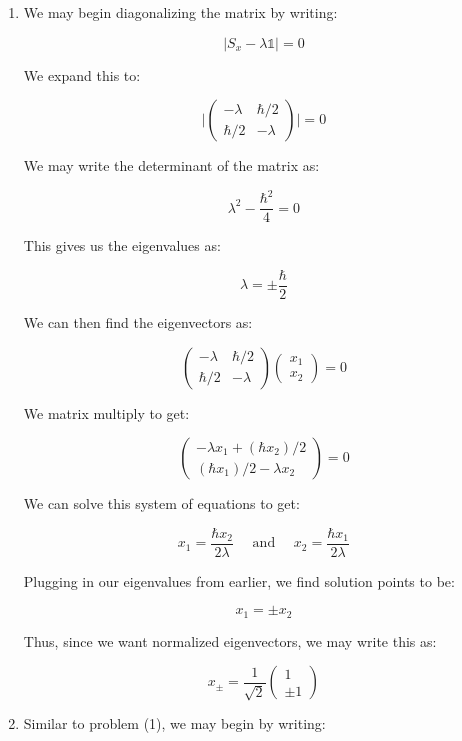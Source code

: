 \begin{enumerate}

  \item We may begin diagonalizing the matrix by writing:

    $$|S_x-\lambda \mathbb{1}|=0$$

    We expand this to:

    $$\Big|\left( \begin{matrix} -\lambda & \hbar/2\\ \hbar/2 & -\lambda\end{matrix} \right)\Big|=0$$

    We may write the determinant of the matrix as:

    $$\lambda^2-\frac{\hbar^2}{4}=0$$

    This gives us the eigenvalues as:

    $$\boxed{\lambda=\pm\frac{\hbar}{2}}$$

    We can then find the eigenvectors as:

    $$\left( \begin{matrix} -\lambda & \hbar/2\\ \hbar/2 & -\lambda \end{matrix} \right)\left( \begin{matrix} x_1\\ x_2\end{matrix} \right)=0$$

    We matrix multiply to get:

    $$\left( \begin{matrix} -\lambda x_1 + (\hbar x_2)/2\\ (\hbar x_1)/2-\lambda x_2\end{matrix} \right)=0$$

    We can solve this system of equations to get:

    $$x_1=\frac{\hbar x_2}{2\lambda}\quad\text{ and }\quad x_2=\frac{\hbar x_1}{2\lambda}$$

    Plugging in our eigenvalues from earlier, we find solution points to be:

    $$x_1=\pm x_2$$

    Thus, since we want normalized eigenvectors, we may write this as:

    $$\boxed{x_{\pm}=\frac{1}{\sqrt{2}}\left( \begin{matrix} 1\\\pm1\end{matrix} \right)}$$

  \item Similar to problem (1), we may begin by writing:


\end{enumerate}
